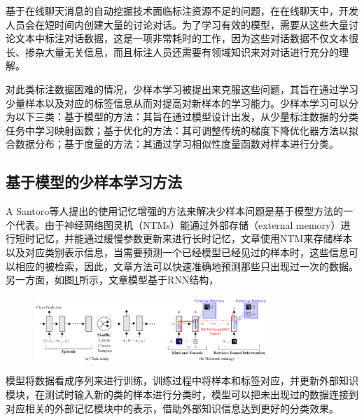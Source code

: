 基于在线聊天消息的自动挖掘技术面临标注资源不足的问题，在在线聊天中，开发人员会在短时间内创建大量的讨论对话。为了学习有效的模型，需要从这些大量讨论文本中标注对话数据，这是一项非常耗时的工作，因为这些对话数据不仅文本很长、掺杂大量无关信息，而且标注人员还需要有领域知识来对对话进行充分的理解。

对此类标注数据困难的情况，少样本学习被提出来克服这些问题\cite{wang2019few}，其旨在通过学习少量样本以及对应的标签信息从而对提高对新样本的学习能力。少样本学习可以分为以下三类\cite{chen2019closer}：基于模型的方法：其旨在通过模型设计出发，从少量标注数据的分类任务中学习映射函数；基于优化的方法：其可调整传统的梯度下降优化器方法以拟合数据分布；基于度量的方法：其通过学习相似性度量函数对样本进行分类。

\subsection{基于模型的少样本学习方法}
A Santoro等人\cite{santoro2016one}提出的使用记忆增强的方法来解决少样本问题是基于模型方法的一个代表。由于神经网络图灵机（NTMs）能通过外部存储（external memory）进行短时记忆，并能通过缓慢参数更新来进行长时记忆，文章使用NTM来存储样本以及对应类别表示信息，当需要预测一个已经模型已经见过的样本时，这些信息可以相应的被检索，因此，文章方法可以快速准确地预测那些只出现过一次的数据。另一方面，如图\ref{fig:few-memory}所示，文章模型基于RNN结构，
\begin{figure}[htb]
    \centering
    \includegraphics[width=0.8\textwidth]{Img/few-memory.png}
    \label{fig:few-memory}
\end{figure}
模型将数据看成序列来进行训练，训练过程中将样本和标签对应，并更新外部知识模块，在测试时输入新的类的样本进行分类时，模型可以把未出现过的数据连接到对应相关的外部记忆模块中的表示，借助外部知识信息达到更好的分类效果。

